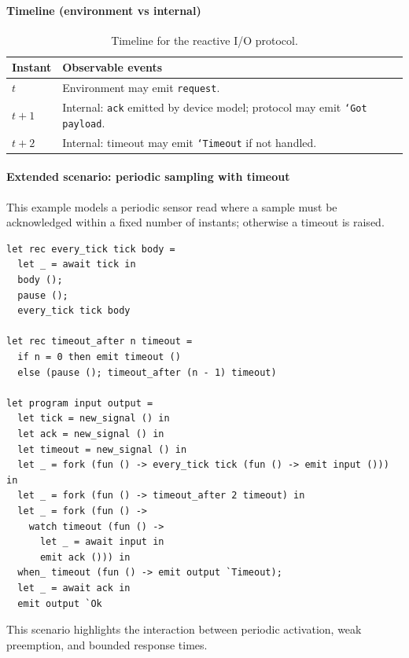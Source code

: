 \paragraph{Timeline (environment vs internal)}
\begin{table}[h]
\centering
\begin{tabularx}{\linewidth}{lY}
\hline
Instant & Observable events \\ \hline
$t$ & Environment may emit \texttt{request}. \\
$t{+}1$ & Internal: \texttt{ack} emitted by device model; protocol may emit
\texttt{`Got payload}. \\
$t{+}2$ & Internal: timeout may emit \texttt{`Timeout} if not handled. \\ \hline
\end{tabularx}
\caption{Timeline for the reactive I/O protocol.}
\end{table}

\paragraph{Extended scenario: periodic sampling with timeout}
This example models a periodic sensor read where a sample must be acknowledged
within a fixed number of instants; otherwise a timeout is raised.
\begin{lstlisting}[style=tempo]
let rec every_tick tick body =
  let _ = await tick in
  body ();
  pause ();
  every_tick tick body

let rec timeout_after n timeout =
  if n = 0 then emit timeout ()
  else (pause (); timeout_after (n - 1) timeout)

let program input output =
  let tick = new_signal () in
  let ack = new_signal () in
  let timeout = new_signal () in
  let _ = fork (fun () -> every_tick tick (fun () -> emit input ())) in
  let _ = fork (fun () -> timeout_after 2 timeout) in
  let _ = fork (fun () ->
    watch timeout (fun () ->
      let _ = await input in
      emit ack ())) in
  when_ timeout (fun () -> emit output `Timeout);
  let _ = await ack in
  emit output `Ok
\end{lstlisting}
This scenario highlights the interaction between periodic activation, weak
preemption, and bounded response times.
